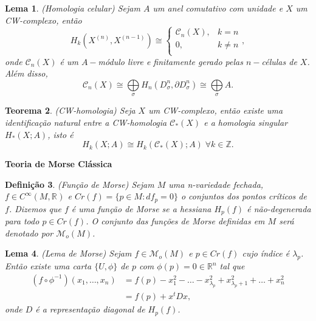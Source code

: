 \documentclass{beamer}
\newcommand{\titulo}[1]{\centering \textbf{#1}}
\newtheorem{teorema}{Teorema}[section]
\newtheorem{lema}[teorema]{Lema}
\newtheorem{definicao}[teorema]{Definição}
\newcommand{\funcoesmorse}[1]{\mathcal{M}_{o}(#1)}
\newcommand{\funcoessuaves}[1]{C^{\infty}(#1, \real{})}
\newcommand{\homologia}[2]{H_{#1}(#2;A)}
\newcommand{\homologiarelcel}[3]{H_{#1}(D^{#2}_{#3}, \partial D^{#2}_{#3})}
\newcommand{\homologiarelskelesimpl}[2]{H_{#1}(X^{(#2)}, X^{(#2-1)})}
\newcommand{\inteiros}{\mathbb{Z}}
\newcommand{\pontoscriticos}[1]{\textit{Cr}(#1)}
\newcommand{\real}[1]{\mathbb{R}^{#1}}
\newcommand{\somadir}[1]{\bigoplus \limits_{#1}}
\begin{document}
\begin{frame}
	
	\begin{lema}
		(Homologia celular) Sejam $A$ um anel comutativo com unidade e $X$ um CW-complexo, então
		$$
		\homologiarelskelesimpl{k}{n} \cong 
		\left\{
		\begin{array}{cc}
		\mathcal{C}_{n}(X), & k = n\\
		0, & k\neq n\\
		\end{array}
		\right.,
		$$
		onde $\mathcal{C}_{n}(X)$ é um $A-$módulo livre e finitamente gerado pelas $n-$células de $X$. Além disso,
		$$
		\mathcal{C}_{n}(X) \cong \somadir{\sigma} \homologiarelcel{n}{n}{\sigma} \cong \somadir{\sigma} A.
		$$
		
	\end{lema}
\end{frame}

\begin{frame}
	\begin{teorema}
		(CW-homologia) Seja $X$ um CW-complexo, então existe uma identificação natural entre a CW-homologia $\mathcal{C}_{*}(X)$ e a homologia singular $\homologia{*}{X}$, isto é 
		$$
		\homologia{k}{X} \cong \homologia{k}{\mathcal{C}_{*}(X)}\; \forall k \in \inteiros.
		$$
	\end{teorema}
\end{frame}

\begin{frame}
	\titulo{Teoria de Morse Clássica}
	\begin{definicao}
		(Função de Morse) Sejam $M$ uma n-variedade fechada, $f \in \funcoessuaves{M}$ e $\pontoscriticos{f} = \{p \in M: df_{p} = 0\}$ o conjuntos dos pontos críticos de $f$. Dizemos que $f$ é uma função de Morse se a hessiana $H_{p}(f)$ é não-degenerada para todo $p \in \pontoscriticos{f}$. O conjunto das funções de Morse definidas em $M$ será denotado por $\funcoesmorse{M}$. 
	\end{definicao}
	\begin{lema}
		(Lema de Morse) Sejam $f \in \funcoesmorse{M}$ e $p \in \pontoscriticos{f}$ cujo índice é $\lambda_{p}$. Então existe uma carta $\{U, \phi\}$ de $p$ com $\phi(p)=0 \in \real{n}$ tal que 
		$$
		\begin{aligned}
		(f\circ \phi^{-1})(x_{1}, \dots, x_{n}) &= f(p)-x_{1}^{2}-\dots -x^{2}_{\lambda_{p}}+x^{2}_{\lambda_{p}+1}+\dots + x^{2}_{n}
		\\
		&=f(p)+x^{t}Dx,
		\end{aligned}
		$$
		onde $D$ é a representação diagonal de $H_{p}(f)$.
	\end{lema}
\end{frame}
\end{document}
